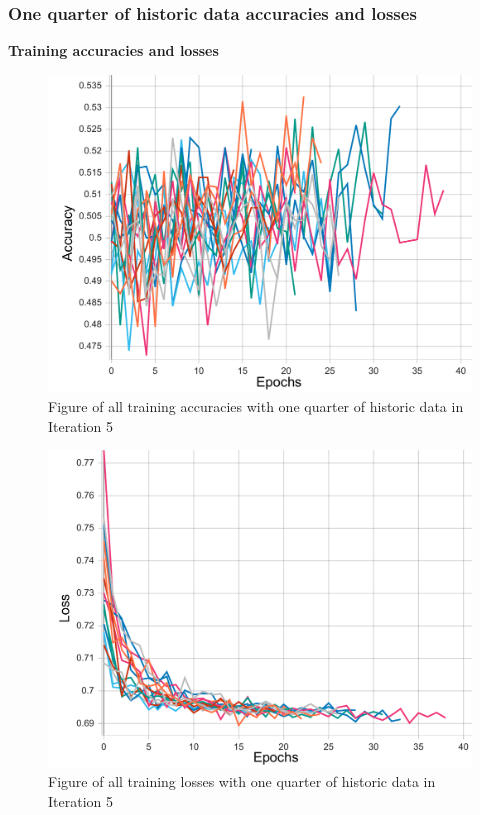 \subsubsection{One quarter of historic data accuracies and losses}
\textbf{Training accuracies and losses}
\begin{figure}[ht]
    \centering
    \includegraphics[width=0.575\columnwidth]{figures/results/final/quarter_acc_t.pdf}
    \caption[Training accuracies for Iteration 5 with one quarter of historic data]{Figure of all training accuracies with one quarter of historic data in Iteration 5}
    \label{fig:iteration5_quarter_train_accuracy}
\end{figure}
\FloatBarrier

\begin{figure}[ht]
    \centering
    \includegraphics[width=0.575\columnwidth]{figures/results/final/quarter_loss_t.pdf}
    \caption[Training losses for Iteration 5 with one quarter of historic data]{Figure of all training losses with one quarter of historic data in Iteration 5}
    \label{fig:iteration5_quarter_train_loss}
\end{figure}
\FloatBarrier

